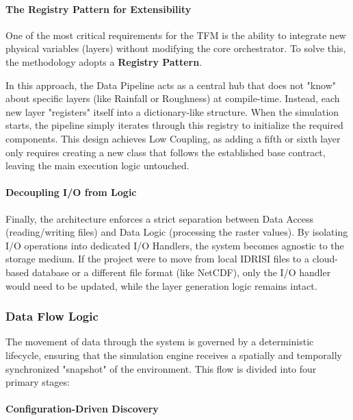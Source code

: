 \paragraph{The Registry Pattern for Extensibility}

One of the most critical requirements for the TFM is the ability to integrate new physical variables 
(layers) without modifying the core orchestrator. To solve this, the methodology adopts a 
\textbf{Registry Pattern}.

In this approach, the Data Pipeline acts as a central hub that does not "know" about specific layers 
(like Rainfall or Roughness) at compile-time. Instead, each new layer "registers" itself into a 
dictionary-like structure. When the simulation starts, the pipeline simply iterates through this 
registry to initialize the required components. This design achieves Low Coupling, as adding a fifth 
or sixth layer only requires creating a new class that follows the established base contract, leaving 
the main execution logic untouched.


\paragraph{Decoupling I/O from Logic}

Finally, the architecture enforces a strict separation between Data Access (reading/writing files) and 
Data Logic (processing the raster values). By isolating I/O operations into dedicated I/O Handlers, 
the system becomes agnostic to the storage medium. If the project were to move from local IDRISI files 
to a cloud-based database or a different file format (like NetCDF), only the I/O handler would need to 
be updated, while the layer generation logic remains intact.


\subsubsection{Data Flow Logic}

The movement of data through the system is governed by a deterministic lifecycle, ensuring that the 
simulation engine receives a spatially and temporally synchronized "snapshot" of the environment. This 
flow is divided into four primary stages:


\paragraph{Configuration-Driven Discovery}

